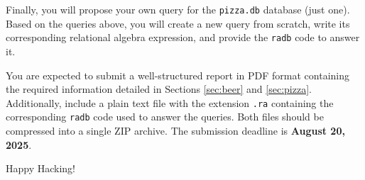 \documentclass{article}
\begin{document}
Finally, you will propose your own query for the \texttt{pizza.db} database (just one). Based on the queries above, you will create a new query from scratch, write its corresponding relational algebra expression, and provide the \texttt{radb} code to answer it.

You are expected to submit a well-structured report in PDF format containing the required information detailed in Sections \ref{sec:beer} and \ref{sec:pizza}. Additionally, include a plain text file with the extension \texttt{.ra} containing the corresponding \texttt{radb} code used to answer the queries. Both files should be compressed into a single ZIP archive. The submission deadline is \textbf{August 20, 2025}.

\vspace{5mm}
Happy Hacking! 
\end{document}
